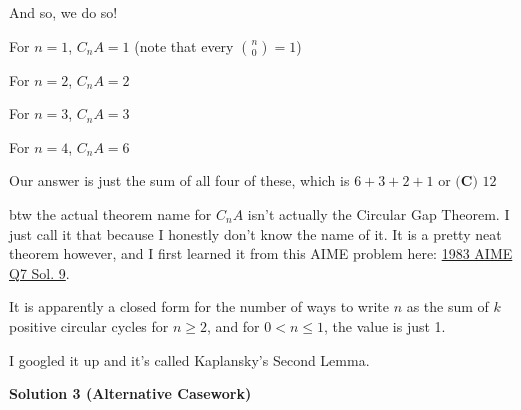 \begin{enumerate}
 And so, we do so!

 For \( n=1 \), \( C_n A = 1 \) (note that every $\binom{n}{0}=1$)

 For \( n=2 \), \( C_n A = 2 \)

 For \( n=3 \), \( C_n A = 3 \)

 For \( n=4 \), \( C_n A = 6 \)

 Our answer is just the sum of all four of these, which is \( 6+3+2+1 \) or $\boxed{\textbf{(C) } 12}$

 btw the actual theorem name for \( C_n A \) isn't actually the Circular Gap Theorem. I just call it that because I honestly don't know the name of it. It is a pretty neat theorem however, and I first learned it from this AIME problem here: \href{https://artofproblemsolving.com/wiki/index.php?title=1983\_AIME\_Problems/Problem\_7}{1983 AIME Q7 Sol. 9}.

 It is apparently a closed form for the number of ways to write $n$ as the sum of $k$ positive circular cycles for $n \ge 2$, and for $0<n \le 1$, the value is just 1.

 
I googled it up and it's called Kaplansky's Second Lemma.

 



\textbf{Solution 3 (Alternative Casework)}


\end{enumerate}
